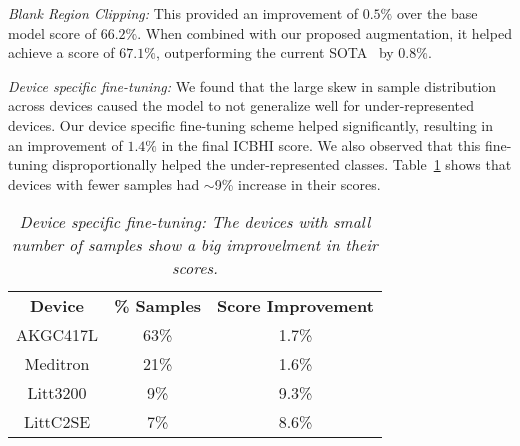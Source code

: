 \documentclass{article}
\begin{document}
\smallskip\noindent\textit{Blank Region Clipping:} This provided an improvement of $0.5\%$ over the base model score of $66.2\%$. When combined with our proposed augmentation, it helped achieve a score of $67.1\%$, outperforming the current SOTA~\cite{acharya_20} by $0.8\%$.

\smallskip\noindent\textit{Device specific fine-tuning:} We found that the large skew in sample distribution across devices caused the model to not generalize well for under-represented devices. Our device specific fine-tuning scheme helped significantly, resulting in an improvement of $1.4\%$ in the final ICBHI score. We also observed that this fine-tuning disproportionally helped the under-represented classes. Table~\ref{tab:scores_device_wise} shows that devices with fewer samples had $\sim$9\% increase in their scores.

\begin{table}[htbp]
    \centering
\small
    \begin{tabular}{c | c | c}
    \toprule
	\textbf{Device} & \textbf{\% Samples}  & \textbf{Score Improvement} \\
    \cmidrule(lr){1-1}
    \cmidrule(lr){2-2}
    \cmidrule(lr){3-3}
    AKGC417L & 63\% & 1.7\%\\

    Meditron & 21\% &  1.6\%\\
   
    Litt3200 & 9\% &  9.3\%\\

    LittC2SE & 7\% & 8.6\%\\
    \bottomrule
    \end{tabular}
\vspace{-2mm}
    \caption{\textit{Device specific fine-tuning: The devices with small number of samples show a big improvelment in their scores.}}
    \label{tab:scores_device_wise}
    \vspace{-12pt}
\end{table}  \vspace{-3mm}
\end{document}
